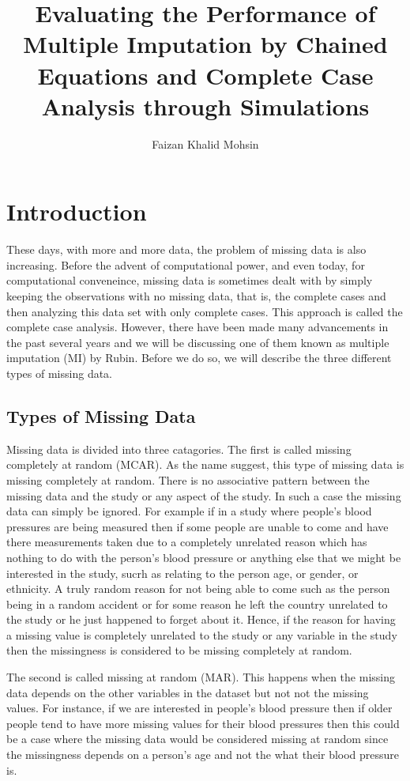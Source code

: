 \documentclass[fleqn,10pt]{wlscirep}\usepackage[]{graphicx}\usepackage[]{color}
\title{Evaluating the Performance of Multiple Imputation by Chained Equations and Complete Case Analysis through Simulations}
\author[1,*]{Faizan Khalid Mohsin}
\affil[1]{University of Toronto, Dalla Lana School of Public Health, Toronto,  M5T 3M7, Canada}
\affil[*]{faizan.mohsin@mail.utoronto.ca}
\begin{document}
\flushbottom
\maketitle

\thispagestyle{empty}

\section{Introduction}

These days, with more and more data, the problem of missing data is also increasing. Before the advent of computational power, and even today, for computational conveneince, missing data is sometimes dealt with by simply keeping the observations with no missing data, that is, the complete cases and then analyzing this data set with only complete cases. This approach is called the complete case analysis. However, there have been made many advancements in the past several years and we will be discussing one of them known as multiple imputation (MI) by Rubin\cite{Figueredo:2009dg}. Before we do so, we will describe the three different types of missing data. 

\subsection{Types of Missing Data}

Missing data is divided into three catagories. The first is called missing completely at random (MCAR). As the name suggest, this type of missing data is missing completely at random. There is no associative pattern between the missing data and the study or any aspect of the study. In such a case the missing data can simply be ignored. For example if in a study where people's blood pressures are being measured then if some people are unable to come and have there measurements taken due to a completely unrelated reason which has nothing to do with the person's blood pressure or anything else that we might be interested in the study, sucrh as relating to the person age, or gender, or ethnicity. A truly random reason for not being able to come such as the person being in a random accident or for some reason he left the country unrelated to the study or he just happened to forget about it. Hence, if the reason for having a missing value is completely unrelated to the study or any variable in the study then the missingness is considered to be missing completely at random. 

The second is called missing at random (MAR). This happens when the missing data depends on the other variables in the dataset but not not the missing values. For instance, if we are interested in people's blood pressure then if older people tend to have more missing values for their blood pressures then this could be a case where the missing data would be considered missing at random since the missingness depends on a person's age and not the what their blood pressure is.  
\end{document}
